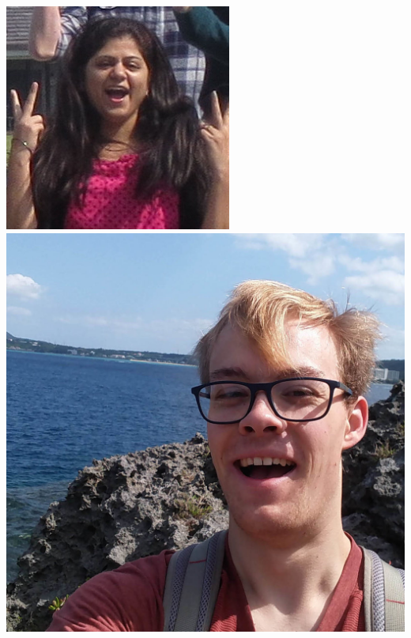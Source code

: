 \documentclass{beamer}
\begin{document}
\begin{frame}
\begin{columns}
\begin{columns}
\includegraphics[width=\textwidth]{Rashi.jpg}
\includegraphics[width=\textwidth]{Peter.jpg}

\end{columns}
\end{columns}
\end{frame}
\end{document}
